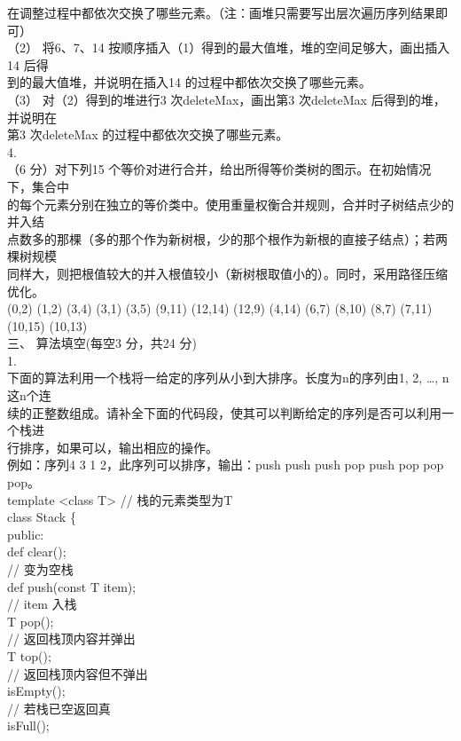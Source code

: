 \begin{question}
在调整过程中都依次交换了哪些元素。（注：画堆只需要写出层次遍历序列结果即可）\\
（2） 将6、7、14 按顺序插入（1）得到的最大值堆，堆的空间足够大，画出插入14 后得\\
到的最大值堆，并说明在插入14 的过程中都依次交换了哪些元素。\\
（3） 对（2）得到的堆进行3 次deleteMax，画出第3 次deleteMax 后得到的堆，并说明在\\
第3 次deleteMax 的过程中都依次交换了哪些元素。\\
4.\\
（6 分）对下列15 个等价对进行合并，给出所得等价类树的图示。在初始情况下，集合中\\
的每个元素分别在独立的等价类中。使用重量权衡合并规则，合并时子树结点少的并入结\\
点数多的那棵（多的那个作为新树根，少的那个根作为新根的直接子结点）；若两棵树规模\\
同样大，则把根值较大的并入根值较小（新树根取值小的）。同时，采用路径压缩优化。\\
(0,2) (1,2) (3,4) (3,1) (3,5) (9,11) (12,14) (12,9) (4,14) (6,7) (8,10) (8,7) (7,11) (10,15) (10,13)\\
三、 算法填空(每空3 分，共24 分)\\
1.\\
下面的算法利用一个栈将一给定的序列从小到大排序。长度为n的序列由1, 2, …, n这n个连\\
续的正整数组成。请补全下面的代码段，使其可以判断给定的序列是否可以利用一个栈进\\
行排序，如果可以，输出相应的操作。\\
例如：序列4 3 1 2，此序列可以排序，输出：push push push pop push pop pop pop。\\
template <class T>                            // 栈的元素类型为T\\
class Stack \{\\
public:\\
def clear();\\
// 变为空栈\\
def push(const T item);\\
//  item 入栈\\
T pop();\\
// 返回栈顶内容并弹出\\
T top();\\
// 返回栈顶内容但不弹出\\
isEmpty();\\
// 若栈已空返回真\\
isFull();\\

\end{question}
